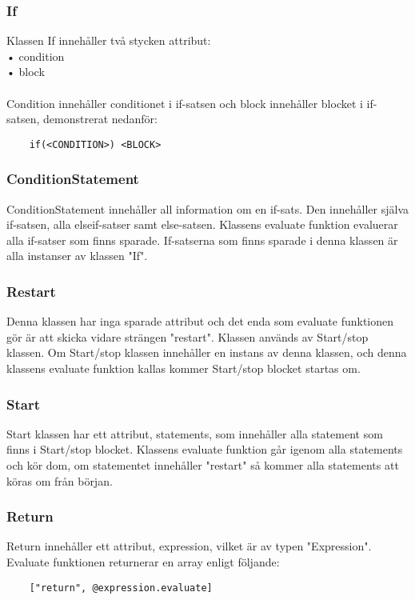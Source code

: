 \documentclass{TDP003mall}
\begin{document}
\subsubsection{If}
Klassen If innehåller två stycken attribut: \\
 • condition \\
 • block\\
\\
Condition innehåller conditionet i if-satsen och block innehåller blocket i if-satsen, demonstrerat nedanför:
\begin{lstlisting}
    if(<CONDITION>) <BLOCK>
\end{lstlisting}

\subsubsection{ConditionStatement}
ConditionStatement innehåller all information om en if-sats. Den innehåller själva if-satsen, alla elseif-satser samt else-satsen. Klassens evaluate funktion evaluerar alla if-satser som finns sparade. If-satserna som finns sparade i denna klassen är alla instanser av klassen "If".

\subsubsection{Restart}
Denna klassen har inga sparade attribut och det enda som evaluate funktionen gör är att skicka vidare strängen "restart". Klassen används av Start/stop klassen. Om Start/stop klassen innehåller en instans av denna klassen, och denna klassens evaluate funktion kallas kommer Start/stop blocket startas om.

\subsubsection{Start}
Start klassen  har ett attribut, statements, som innehåller alla statement som finns i Start/stop blocket. Klassens evaluate funktion går igenom alla statements och kör dom, om statementet innehåller "restart" så kommer alla statements att köras om från början.

\subsubsection{Return}
Return innehåller ett attribut, expression, vilket är av typen "Expression". Evaluate funktionen returnerar en array enligt följande:
\begin{lstlisting}
    ["return", @expression.evaluate]
\end{lstlisting}
\end{document}
